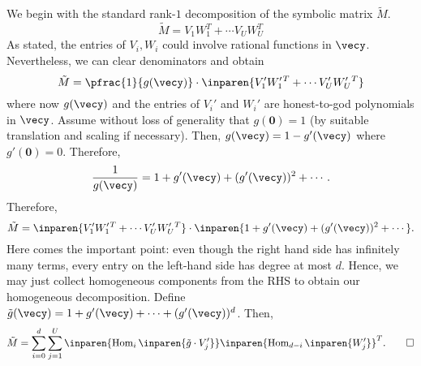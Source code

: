 We begin with the standard rank-$1$ decomposition of the symbolic matrix $\tilde{M}$.
\[
  \tilde{M} = V_1 W_1^T + \cdots V_U W_U^T
\]
As stated, the entries of $V_i,W_i$ could involve rational functions in $\vecy$. Nevertheless, we can clear denominators and obtain
\[
\tilde{M} = \pfrac{1}{g(\vecy)} \cdot \inparen{V'_1 W'_1{}^T + \cdots V'_U W'_U{}^T}
\]
where now $g(\vecy)$ and the entries of $V_i'$ and $W_i'$ are honest-to-god polynomials in $\vecy$. Assume without loss of generality that $g(\mathbf{0}) = 1$ (by suitable translation and scaling if necessary). Then, $g(\vecy) = 1 - g'(\vecy)$ where $g'(\mathbf{0}) = 0$. Therefore,
\[
\frac{1}{g(\vecy)} = 1 + g'(\vecy) + (g'(\vecy))^2 + \cdots . 
\]
Therefore, 
\[
  \tilde{M} = \inparen{V'_1 W'_1{}^T + \cdots V'_U W'_U{}^T} \cdot \inparen{1 + g'(\vecy) + (g'(\vecy))^2 + \cdots}.
\]
Here comes the important point: even though the right hand side has infinitely many terms, every entry on the left-hand side has degree at most $d$. Hence, we may just collect homogeneous components from the RHS to obtain our homogeneous decomposition. Define $\tilde{g}(\vecy) = 1 + g'(\vecy) + \cdots + (g'(\vecy))^d$. Then,
\[
  \tilde{M} = \sum_{i=0}^d \sum_{j=1}^U \inparen{\operatorname{Hom}_{ i}\inparen{\tilde{g} \cdot V_j'}} \inparen{\operatorname{Hom}_{d - i}\inparen{W_j'}}^T. \qed
\]


